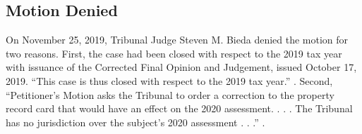 \documentclass[12pt,\documentclassflag]{michiganCourtOfAppealsBrief}
\begin{document}
\subsection{Motion Denied}

On November 25, 2019, Tribunal Judge Steven M. Bieda denied the motion for two reasons. First, the case had been closed with respect to the 2019 tax year with issuance of the Corrected Final Opinion and Judgement, issued October 17, 2019. ``This case is thus closed with respect to the 2019 tax year.'' . Second, ``Petitioner's Motion asks the Tribunal to order a correction to the property record card that would have an effect on the 2020 assessment. . . . The Tribunal has no jurisdiction over the subject's 2020 assessment . . .'' .




\end{document}
